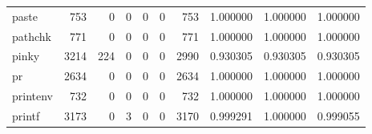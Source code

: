 \begin{longtable}{lrrrrrrrrr}
paste     &                                                753 &                                                  0 &                                                  0 &                                                  0 &                                                  0 &                                                753 &                                           1.000000 &                               1.000000 &                             1.000000 \\
pathchk   &                                                771 &                                                  0 &                                                  0 &                                                  0 &                                                  0 &                                                771 &                                           1.000000 &                               1.000000 &                             1.000000 \\
pinky     &                                               3214 &                                                224 &                                                  0 &                                                  0 &                                                  0 &                                               2990 &                                           0.930305 &                               0.930305 &                             0.930305 \\
pr        &                                               2634 &                                                  0 &                                                  0 &                                                  0 &                                                  0 &                                               2634 &                                           1.000000 &                               1.000000 &                             1.000000 \\
printenv  &                                                732 &                                                  0 &                                                  0 &                                                  0 &                                                  0 &                                                732 &                                           1.000000 &                               1.000000 &                             1.000000 \\
printf    &                                               3173 &                                                  0 &                                                  3 &                                                  0 &                                                  0 &                                               3170 &                                           0.999291 &                               1.000000 &                             0.999055 \\

\end{longtable}
